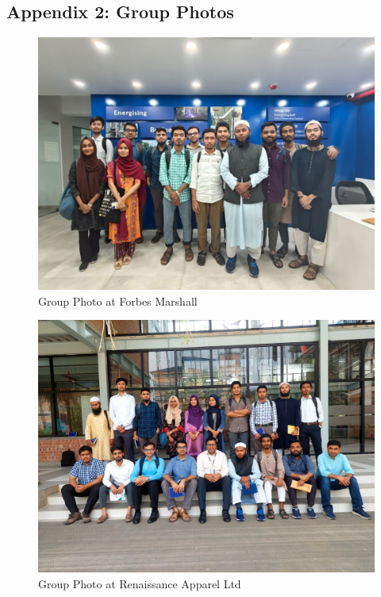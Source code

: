 \documentclass[12pt]{article}
\begin{document}
\begin{appendices}
    \section{Appendix 2: Group Photos}
    \begin{figure}[h!]
        \centering
        \includegraphics[width=0.8\linewidth]{figs/group_pic_fm.jpg}
        \caption{Group Photo at Forbes Marshall}
        \label{fig:group_pic_fm}
    \end{figure}
    
    \begin{figure}[h!]
        \centering
        \includegraphics[width=0.8\linewidth]{figs/group_pic_ral.jpg}
        \caption{Group Photo at Renaissance Apparel Ltd}
        \label{fig:group_pic_ral}
    \end{figure}

\end{appendices}



\end{document}
